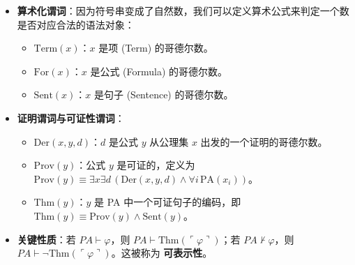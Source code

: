 \documentclass[12pt, a4paper]{article}
\begin{document}
\begin{itemize}
\begin{enumerate}
        \item \textbf{证明序列的编码 (CRT 方法)}：上述素数幂乘积方法有一个缺陷：当序列很长时，得到的数字会极其巨大，导致算术运算（如加法、乘法）在证明中变得极其复杂。
        因此，哥德尔在实际构造中采用了基于\textbf{中国剩余定理 (CRT)} 的编码方式。
        具体来说，我们寻找一个数 \(z\) 和模数 \(m_0, m_1, \dots, m_k\)（它们两两互素），使得：
        \[
        z \equiv \ulcorner s_i \urcorner \pmod{m_i} \quad (0 \leq i \leq k)
        \]
        这样，一个证明序列就被编码为两个较小的自然数 \((z, m)\)。由于 CRT 保证了同余方程组在模 \(M = \prod m_i\) 下有唯一解，我们便可以通过取模运算，从中“提取”出原来的符号序列。
    \end{enumerate}
    我们用 \(\ulcorner \varphi \urcorner\) 表示公式 \(\varphi\) 的哥德尔数，用 \(\ulcorner \mathcal{D} \urcorner\) 表示证明 \(\mathcal{D}\) 的哥德尔数。这一映射使得“公式 \(x\) 是合法的”、“\(d\) 是 \(y\) 的证明”等元数学概念，都变成了 PA 中关于自然数的算术命题。
    \item \textbf{算术化谓词}：因为符号串变成了自然数，我们可以定义算术公式来判定一个数是否对应合法的语法对象：
    \begin{itemize}
        \item \(\text{Term}(x)\)：\(x\) 是项 (Term) 的哥德尔数。
        \item \(\text{For}(x)\)：\(x\) 是公式 (Formula) 的哥德尔数。
        \item \(\text{Sent}(x)\)：\(x\) 是句子 (Sentence) 的哥德尔数。
    \end{itemize}
    \item \textbf{证明谓词与可证性谓词}：
    \begin{itemize}
        \item \(\text{Der}(x, y, d)\)：\(d\) 是公式 \(y\) 从公理集 \(x\) 出发的一个证明的哥德尔数。
        \item \(\text{Prov}(y)\)：公式 \(y\) 是可证的，定义为 \(\text{Prov}(y) \equiv \exists x \exists d \, (\text{Der}(x, y, d) \wedge \forall i \, \text{PA}(x_i))\)。
        \item \(\text{Thm}(y)\)：\(y\) 是 PA 中一个可证句子的编码，即 \(\text{Thm}(y) \equiv \text{Prov}(y) \wedge \text{Sent}(y)\)。
    \end{itemize}
    \item \textbf{关键性质}：若 \(PA \vdash \varphi\)，则 \(PA \vdash \text{Thm}(\ulcorner \varphi \urcorner)\)；若 \(PA \nvdash \varphi\)，则 \(PA \vdash \neg \text{Thm}(\ulcorner \varphi \urcorner)\)。这被称为 \textbf{可表示性}。
\end{itemize}
\end{document}
